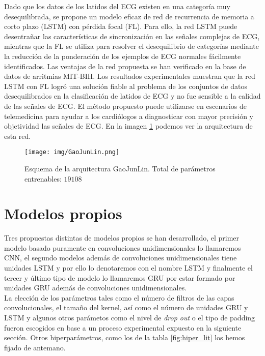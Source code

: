     
    Dado que los datos de los latidos del ECG existen en una categoría muy desequilibrada, se propone un modelo eficaz de red de recurrencia de memoria a corto plazo (LSTM) con pérdida focal (FL). Para ello, la red LSTM puede desentrañar las características de sincronización en las señales complejas de ECG, mientras que la FL se utiliza para resolver el desequilibrio de categorías mediante la reducción de la ponderación de los ejemplos de ECG normales fácilmente identificados. Las ventajas de la red propuesta se han verificado en la base de datos de arritmias MIT-BIH. Los resultados experimentales muestran que la red LSTM con FL logró una solución fiable al problema de los conjuntos de datos desequilibrados en la clasificación de latidos de ECG y no fue sensible a la calidad de las señales de ECG. El método propuesto puede utilizarse en escenarios de telemedicina para ayudar a los cardiólogos a diagnosticar con mayor precisión y objetividad las señales de ECG. En la imagen \ref{fig:gaojunlin} podemos ver la arquitectura de esta red.  \\
    
    
    
        \begin{figure}[htpb]
                \centering
                \texttt{[image: img/GaoJunLin.png]}
                \caption{Esquema de la arquitectura GaoJunLin. Total de parámetros entrenables: $19108$ }
                \label{fig:gaojunlin}
        \end{figure}
            
\newpage
\section{Modelos propios}
    
        Tres propuestas distintas de modelos propios se han desarrollado, el primer modelo basado puramente en convoluciones unidimensionales lo llamaremos CNN, el segundo modelos además de convoluciones unidimensionales tiene unidades LSTM y por ello lo denotaremos con el nombre LSTM y finalmente el tercer y último tipo de modelo lo llamaremos GRU por estar formado por unidades GRU además de convoluciones unidimensionales. \\
        
        La elección de los parámetros tales como el número de filtros de las capas convolucionales, el tamaño del kernel, así como el número de unidades GRU y LSTM y algunos otros parámetos como el nivel de \textit{drop out} o el tipo de padding fueron escogidos en base a un proceso experimental expuesto en la siguiente sección. Otros hiperparámetros, como los de la tabla \ref{fig:hiper_lit} los hemos fijado de antemano.\\
        
